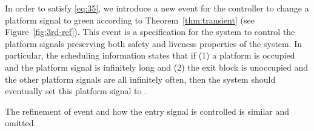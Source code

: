 In order to satisfy \ref{eq:35}, we introduce a new event
\ctrlplf for the controller to change a platform signal to green according to
Theorem~\ref{thm:transient} (see Figure~\ref{fig:3rd-ref}).
This event \ctrlplf is a specification for the system to control the
platform signals preserving both safety and liveness properties of the
system.  In particular, the scheduling information states that if (1)
a platform is occupied and the platform signal is \RED infinitely long
and (2) the exit block is unoccupied and the other platform signals
are all \RED infinitely often, then the system should eventually set
this platform signal to \GREEN.

The refinement of event \movein and how the entry signal is controlled
is similar and omitted.

